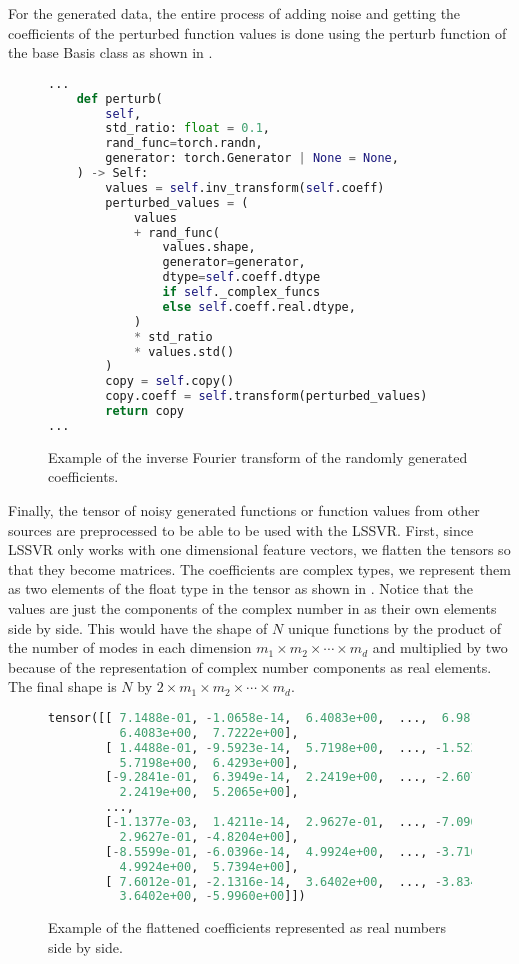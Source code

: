 For the generated data, the entire process of adding noise and getting the coefficients of the perturbed function values is done using the perturb function of the base Basis class as shown in .
\begin{figure}[H]
  \centering
  \begin{lstlisting}[language=Python]
...
    def perturb(
        self,
        std_ratio: float = 0.1,
        rand_func=torch.randn,
        generator: torch.Generator | None = None,
    ) -> Self:
        values = self.inv_transform(self.coeff)
        perturbed_values = (
            values
            + rand_func(
                values.shape,
                generator=generator,
                dtype=self.coeff.dtype
                if self._complex_funcs
                else self.coeff.real.dtype,
            )
            * std_ratio
            * values.std()
        )
        copy = self.copy()
        copy.coeff = self.transform(perturbed_values)
        return copy
...
\end{lstlisting}
  \caption{Example of the inverse Fourier transform of the randomly generated coefficients.}\label{fig:basis_perturb_impl}
\end{figure}

Finally, the tensor of noisy generated functions or function values from other sources are preprocessed to be able to be used with the LSSVR\@. First, since LSSVR only works with one dimensional feature vectors, we flatten the tensors so that they become matrices. The coefficients are complex types, we represent them as two elements of the float type in the tensor as shown in . Notice that the values are just the components of the complex number in  as their own elements side by side. This would have the shape of \(N\) unique functions by the product of the number of modes in each dimension \(m_1\times m_2 \times\cdots\times m_d\) and multiplied by two because of the representation of complex number components as real elements. The final shape is \(N\) by \(2\times m_1\times m_2 \times\cdots\times m_d\).
\begin{figure}[H]
  \centering
  \begin{lstlisting}[language=Python]
tensor([[ 7.1488e-01, -1.0658e-14,  6.4083e+00,  ...,  6.9812e+00,
          6.4083e+00,  7.7222e+00],
        [ 1.4488e-01, -9.5923e-14,  5.7198e+00,  ..., -1.5238e+00,
          5.7198e+00,  6.4293e+00],
        [-9.2841e-01,  6.3949e-14,  2.2419e+00,  ..., -2.6073e+00,
          2.2419e+00,  5.2065e+00],
        ...,
        [-1.1377e-03,  1.4211e-14,  2.9627e-01,  ..., -7.0965e-01,
          2.9627e-01, -4.8204e+00],
        [-8.5599e-01, -6.0396e-14,  4.9924e+00,  ..., -3.7167e+00,
          4.9924e+00,  5.7394e+00],
        [ 7.6012e-01, -2.1316e-14,  3.6402e+00,  ..., -3.8345e+00,
          3.6402e+00, -5.9960e+00]])
\end{lstlisting}
  \caption{Example of the flattened coefficients represented as real numbers side by side.}\label{fig:example_coeff_flat_real}
\end{figure}

